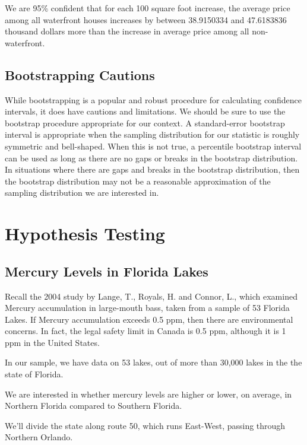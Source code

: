 \documentclass[
  letterpaper,
  DIV=11,
  numbers=noendperiod]{scrreprt}
\begin{document}
We are 95\% confident that for each 100 square foot increase, the
average price among all waterfront houses increases by between
38.9150334 and 47.6183836 thousand dollars more than the increase in
average price among all non-waterfront.

\subsection{Bootstrapping Cautions}\label{bootstrapping-cautions}

While bootstrapping is a popular and robust procedure for calculating
confidence intervals, it does have cautions and limitations. We should
be sure to use the bootstrap procedure appropriate for our context. A
standard-error bootstrap interval is appropriate when the sampling
distribution for our statistic is roughly symmetric and bell-shaped.
When this is not true, a percentile bootstrap interval can be used as
long as there are no gaps or breaks in the bootstrap distribution. In
situations where there are gaps and breaks in the bootstrap
distribution, then the bootstrap distribution may not be a reasonable
approximation of the sampling distribution we are interested in.

\section{Hypothesis Testing}\label{hypothesis-testing}

\subsection{Mercury Levels in Florida
Lakes}\label{mercury-levels-in-florida-lakes}

Recall the 2004 study by Lange, T., Royals, H. and Connor, L., which
examined Mercury accumulation in large-mouth bass, taken from a sample
of 53 Florida Lakes. If Mercury accumulation exceeds 0.5 ppm, then there
are environmental concerns. In fact, the legal safety limit in Canada is
0.5 ppm, although it is 1 ppm in the United States.

In our sample, we have data on 53 lakes, out of more than 30,000 lakes
in the the state of Florida.

We are interested in whether mercury levels are higher or lower, on
average, in Northern Florida compared to Southern Florida.

We'll divide the state along route 50, which runs East-West, passing
through Northern Orlando.
\end{document}
